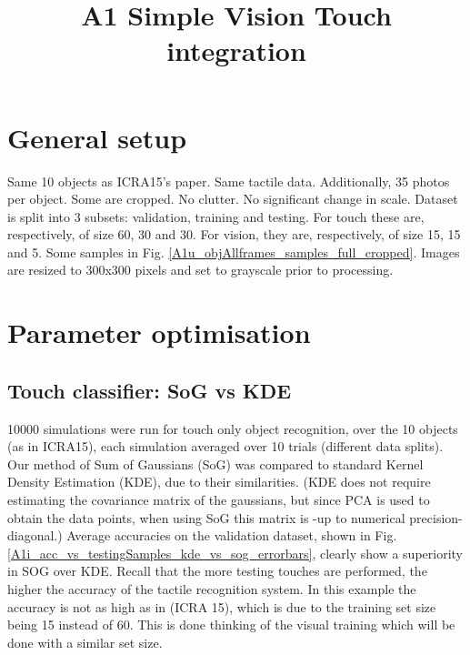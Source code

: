 \documentclass[]{article}
\title{A1 Simple Vision Touch integration}
\author{}
\begin{document}
\maketitle

\begin{abstract}

\end{abstract}

\section{General setup}
Same 10 objects as ICRA15's paper. Same tactile data. Additionally, 35 photos per object. Some are cropped. No clutter. No significant change in scale.
Dataset is split into 3 subsets: validation, training and testing. For touch these are, respectively, of size 60, 30 and 30. For vision, they are, respectively, of size 15, 15 and 5.
Some samples in Fig. \ref{A1u_objAllframes_samples_full_cropped}. Images are resized to 300x300 pixels and set to grayscale prior to processing.

\begin{figure}
\centering
{}
\end{figure}



\section{Parameter optimisation}

\subsection{Touch classifier: SoG vs KDE}

10000 simulations were run for touch only object recognition, over the 10 objects (as in ICRA15), each simulation averaged over 10 trials (different data splits). Our method of Sum of Gaussians (SoG) was compared to standard Kernel Density Estimation (KDE), due to their similarities. (KDE does not require estimating the covariance matrix of the gaussians, but since PCA is used to obtain the data points, when using SoG this matrix is -up to numerical precision- diagonal.) 
Average accuracies on the validation dataset, shown in Fig. \ref{A1i_acc_vs_testingSamples_kde_vs_sog_errorbars}, clearly show a superiority in SOG over KDE.
Recall that the more testing touches are performed, the higher the accuracy of the tactile recognition system. In this example the accuracy is not as high as in (ICRA 15), which is due to the training set size being 15 instead of 60. This is done thinking of the visual training which will be done with a similar set size.
\end{document}
